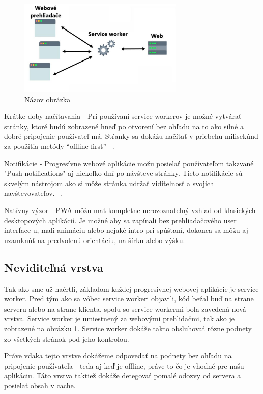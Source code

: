 \begin{figure}[H]
  \centering
  \includegraphics[width=0.7\textwidth]{img/image1.pdf}
  \caption{Názov obrázka \cite{Ater2017BuildingPWA}}
  \label{fig:obrazok1}
\end{figure}

Krátke doby načítavania - Pri používaní service workerov je možné vytvárať stránky, ktoré budú zobrazené hneď po otvorení bez ohľadu na to
ako silné a dobré pripojenie používateľ má. Stŕanky sa dokážu načítať v priebehu milisekúnd za použitia metódy ``offline first'' ~\cite{Ater2017BuildingPWA}.

Notifikácie - Progresívne webové aplikácie možu posielať používateľom takzvané "Push notifications" aj niekoľko dní po návšteve stránky. Tieto
notifikácie sú skvelým nástrojom ako si môže stránka udržať viditeľnosť a svojich navštevovateľov. ~\cite{Ater2017BuildingPWA}.

Natívny výzor - PWA môžu mať kompletne nerozoznatelný vzhľad od klasických desktopových aplikácií. Je možné aby sa zapínali bez prehliadačového
user interface-u, mali animáciu alebo nejaké intro pri spúštaní, dokonca sa môžu aj uzamknúť na predvolenú orientáciu, na šírku alebo výšku.

\subsection{Neviditeľná vrstva}
\label{subsec:neviditeľnávrstva}
Tak ako sme už načrtli, základom každej progresívnej webovej aplikácie je service worker. Pred tým ako sa vôbec service workeri objavili, kód
bežal buď na strane serveru alebo na strane klienta, spolu so service workermi bola zavedená nová vrstva. Service worker je umiestnený za webovými
prehlidačmi, tak ako je zobrazené na obrázku \ref{fig:obrazok1}. Service worker dokáže takto obsluhovať rôzne podnety zo všetkých stránok pod jeho
kontrolou. 

Práve vďaka tejto vrstve dokážeme odpovedať na podnety bez ohľadu na pripojenie používateľa - teda aj keď je offline, práve to čo je vhodné pre
našu aplikáciu. Táto vrstva taktiež dokáže detegovať pomalé odozvy od servera a posielať obsah v cache.

